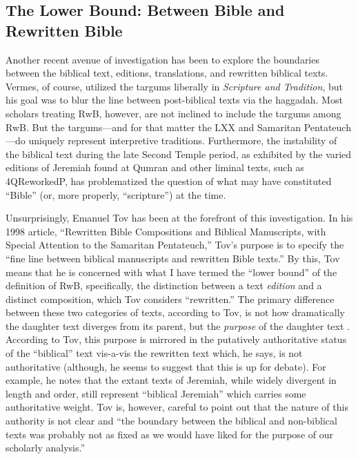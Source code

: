 \subsection{The Lower Bound: Between Bible and
Rewritten Bible}\label{the-lower-bound-between-bible-and-rwb}

Another recent avenue of investigation has been to explore the
boundaries between the biblical text, editions, translations, and
rewritten biblical texts. Vermes, of course, utilized the targums
liberally in \emph{Scripture and Tradition}, but his goal was to blur
the line between post-biblical texts via the haggadah. Most scholars
treating RwB, however, are not inclined to include the targums among
RwB. But the targums---and for that matter the LXX and Samaritan
Pentateuch---do uniquely represent interpretive traditions. Furthermore,
the instability of the biblical text during the late Second Temple
period, as exhibited by the varied editions of Jeremiah found at Qumran
and other liminal texts, such as 4QReworkedP, has problematized the
question of what may have constituted ``Bible'' (or, more properly,
``scripture'') at the time.

Unsurprisingly, Emanuel Tov has been at the forefront of this
investigation. In his 1998 article, ``Rewritten Bible Compositions and
Biblical Manuscripts, with Special Attention to the Samaritan
Pentateuch,'' Tov's purpose is to specify the ``fine line between
biblical manuscripts and rewritten Bible
texts.''\autocite[334]{tov_dsd1998} By this, Tov means that he is
concerned with what I have termed the ``lower bound'' of the definition
of RwB, specifically, the distinction between a text \emph{edition} and
a distinct composition, which Tov considers ``rewritten.'' The primary
difference between these two categories of texts, according to Tov, is
not how dramatically the daughter text diverges from its parent, but the
\emph{purpose} of the daughter text \autocite[334]{tov_dsd1998}.
According to Tov, this purpose is mirrored in the putatively
authoritative status of the ``biblical'' text vis-a-vis the rewritten
text which, he says, is not authoritative (although, he seems to suggest
that this is up for debate\autocite[337]{tov_dsd1998}). For example, he
notes that the extant texts of Jeremiah, while widely divergent in
length and order, still represent ``biblical Jeremiah'' which carries
some authoritative weight. Tov is, however, careful to point out that
the nature of this authority is not clear and ``the boundary between the
biblical and non-biblical texts was probably not as fixed as we would
have liked for the purpose of our scholarly
analysis.''\autocite[335]{tov_dsd1998}

